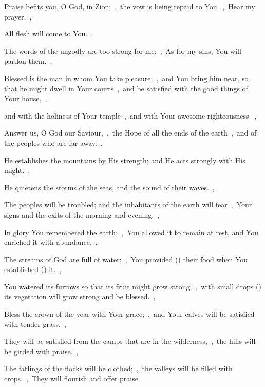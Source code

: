 \documentclass[12pt,twoside,a5paper]{article}
\begin{document}
\begin{normalparskip}
  Praise befits you, O God, in Zion;~\sep\ the vow is being repaid to You.~\sep\ Hear my prayer.~\sep


  All flesh will come to You.~\sep

  The words of the ungodly are too strong for me;~\sep\ As for my sins, You will pardon them.~\sep

  Blessed is the man in whom You take pleasure;~\sep\ and You bring him near, so that he might dwell in Your courts~\sep\ and be satisfied with the good things of Your house,~\sep

  and with the holiness of Your temple~\sep\ and with Your awesome righteousness.~\sep

  Answer us, O God our Saviour,~\sep\ the Hope of all the ends of the earth~\sep\ and of the peoples who are far away.~\sep

  He establishes the mountains by His strength; and He acts strongly with His might.~\sep

  He quietens the storms of the seas, and the sound of their waves.~\sep

  The peoples will be troubled; and the inhabitants of the earth will fear~\sep\ Your signs and the exits of the morning and evening.~\sep

  In glory You remembered the earth;~\sep\ You allowed it to remain at rest, and You enriched it with abundance.~\sep

  The streams of God are full of water;~\sep\ You provided () their food when You established () it.~\sep

  You watered its furrows so that its fruit might grow strong;~\sep\ with small drops () its vegetation will grow strong and be blessed.~\sep

  Bless the crown of the year with Your grace;~\sep\ and Your calves will be satisfied with tender grass.~\sep

  They will be satisfied from the camps that are in the wilderness,~\sep\ the hills will be girded with praise.~\sep

  The fatlings of the flocks will be clothed;~\sep\ the valleys will be filled with crops.~\sep\ They will flourish and offer praise.
\end{normalparskip}
\end{document}
